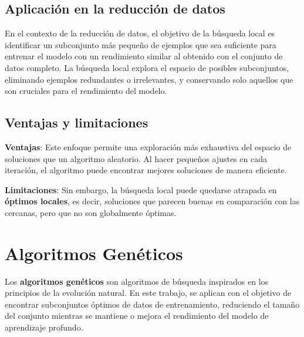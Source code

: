 \subsection{Aplicación en la reducción de datos}\label{subsec:aplicacion-en-la-reduccion-de-datos2}
En el contexto de la reducción de datos, el objetivo de la búsqueda local es identificar un subconjunto más pequeño de
ejemplos que sea suficiente para entrenar el modelo con un rendimiento similar al obtenido con el conjunto de datos
completo.
La búsqueda local explora el espacio de posibles subconjuntos, eliminando ejemplos redundantes o irrelevantes, y
conservando solo aquellos que son cruciales para el rendimiento del modelo.

\subsection{Ventajas y limitaciones}\label{subsec:ventajas-y-limitaciones}
\textbf{Ventajas}: Este enfoque permite una exploración más exhaustiva del espacio de soluciones que un algoritmo
aleatorio.
Al hacer pequeños ajustes en cada iteración, el algoritmo puede encontrar mejores soluciones de manera eficiente.


\textbf{Limitaciones}: Sin embargo, la búsqueda local puede quedarse atrapada en \textbf{óptimos locales}, es decir,
soluciones que parecen buenas en comparación con las cercanas, pero que no son globalmente óptimas.

\section{Algoritmos Genéticos}\label{sec:algoritmos-geneticos}
Los \textbf{algoritmos genéticos} son algoritmos de búsqueda inspirados en los principios de la evolución natural.
En este trabajo, se aplican con el objetivo de encontrar subconjuntos óptimos de datos de entrenamiento, reduciendo el
tamaño del conjunto mientras se mantiene o mejora el rendimiento del modelo de aprendizaje profundo.

